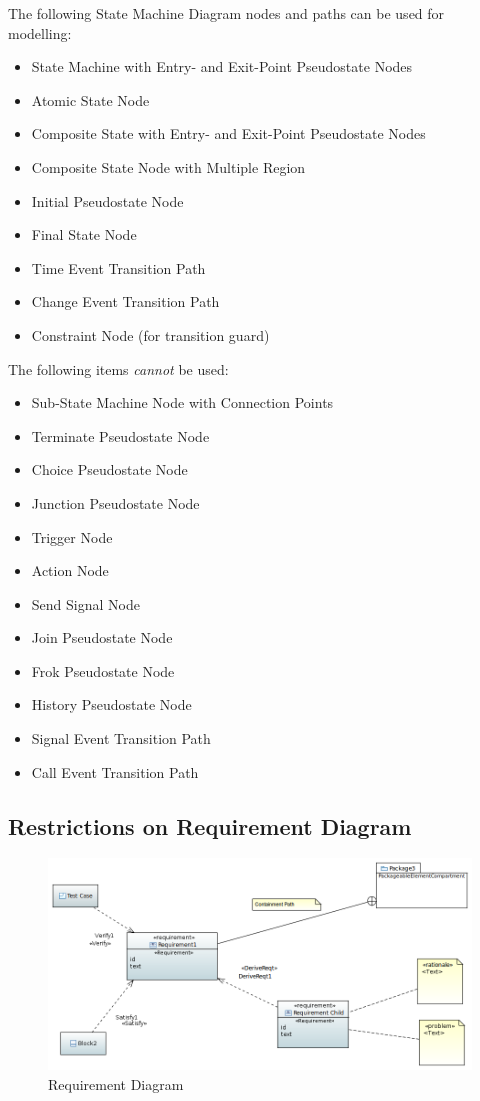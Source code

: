 The following State Machine Diagram nodes and paths can be used for
modelling:
\begin{itemize}
\item State Machine with Entry- and Exit-Point Pseudostate Nodes
\item Atomic State Node
\item Composite State with Entry- and Exit-Point Pseudostate Nodes
\item Composite State Node with Multiple Region
\item Initial Pseudostate Node
\item Final State Node
\item Time Event Transition Path
\item Change Event Transition Path
\item Constraint Node (for transition guard)
\end{itemize}

The following items \emph{cannot} be used:
\begin{itemize}
\item Sub-State Machine Node with Connection Points
\item Terminate Pseudostate Node
\item Choice Pseudostate Node
\item Junction Pseudostate Node
\item Trigger Node
\item Action Node
\item Send Signal Node
\item Join Pseudostate Node
\item Frok Pseudostate Node
\item History Pseudostate Node
\item Signal Event Transition Path
\item Call Event Transition Path
\end{itemize}

\subsection{Restrictions on Requirement Diagram}

\begin{figure}[ht]
  \centering
  \includegraphics[width=\textwidth]{images/RequirementDiagram.PNG}
  \caption{Requirement Diagram}
  \label{fig:req diagram}
\end{figure}


